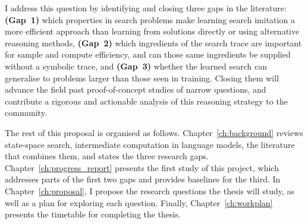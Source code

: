 I address this question by identifying and closing three gaps in the literature: \textbf{(Gap~1)} which properties in search problems make learning search imitation a more efficient approach than learning from solutions directly or using alternative reasoning methods, \textbf{(Gap~2)} which ingredients of the search trace are important for sample and compute efficiency, and can those same ingredients be supplied without a symbolic trace, and \textbf{(Gap~3)} whether the learned search can generalise to problems larger than those seen in training.
Closing them will advance the field past proof-of-concept studies of narrow questions, and contribute a rigorous and actionable analysis of this reasoning strategy to the community.

The rest of this proposal is organised as follows.
Chapter~\ref{ch:background} reviews state-space search, intermediate computation in language models, the literature that combines them, and states the three research gaps.
Chapter~\ref{ch:progress_report} presents the first study of this project, which addresses parts of the first two gaps and provides baselines for the third.
In Chapter~\ref{ch:proposal}, I propose the research questions the thesis will study, as well as a plan for exploring each question.
Finally, Chapter~\ref{ch:workplan} presents the timetable for completing the thesis.
